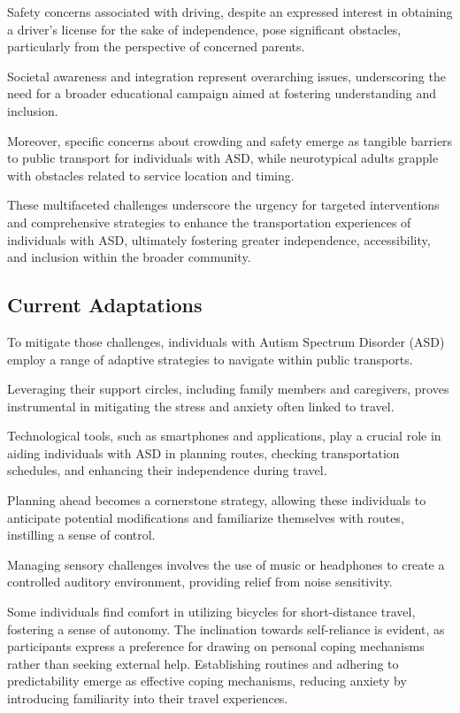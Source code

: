     Safety concerns associated with driving, despite an expressed interest in obtaining a driver's license for the sake of independence, pose significant obstacles, particularly from the perspective of concerned parents. 
    
    Societal awareness and integration represent overarching issues, underscoring the need for a broader educational campaign aimed at fostering understanding and inclusion. 
    
    Moreover, specific concerns about crowding and safety emerge as tangible barriers to public transport for individuals with ASD, while neurotypical adults grapple with obstacles related to service location and timing. 
    
    These multifaceted challenges underscore the urgency for targeted interventions and comprehensive strategies to enhance the transportation experiences of individuals with ASD, ultimately fostering greater independence, accessibility, and inclusion within the broader community.

\subsection{Current Adaptations}

   To mitigate those challenges, individuals with Autism Spectrum Disorder (ASD) employ a range of adaptive strategies to navigate within public transports. 
   
   Leveraging their support circles, including family members and caregivers, proves instrumental in mitigating the stress and anxiety often linked to travel. 
   
   Technological tools, such as smartphones and applications, play a crucial role in aiding individuals with ASD in planning routes, checking transportation schedules, and enhancing their independence during travel. 
   
   Planning ahead becomes a cornerstone strategy, allowing these individuals to anticipate potential modifications and familiarize themselves with routes, instilling a sense of control.
   
   Managing sensory challenges involves the use of music or headphones to create a controlled auditory environment, providing relief from noise sensitivity. 
   
   Some individuals find comfort in utilizing bicycles for short-distance travel, fostering a sense of autonomy. The inclination towards self-reliance is evident, as participants express a preference for drawing on personal coping mechanisms rather than seeking external help. Establishing routines and adhering to predictability emerge as effective coping mechanisms, reducing anxiety by introducing familiarity into their travel experiences. 
   
